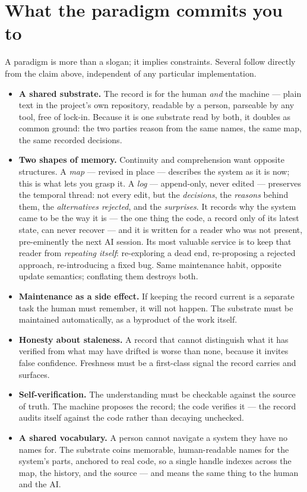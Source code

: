\documentclass[11pt]{article}
\begin{document}
\section{What the paradigm commits you to}

A paradigm is more than a slogan; it implies constraints. Several follow directly from the claim
above, independent of any particular implementation.

\begin{itemize}
  \item \textbf{A shared substrate.} The record is for the human \emph{and} the machine --- plain
  text in the project's own repository, readable by a person, parseable by any tool, free of
  lock-in. Because it is one substrate read by both, it doubles as common ground: the two parties
  reason from the same names, the same map, the same recorded decisions.

  \item \textbf{Two shapes of memory.} Continuity and comprehension want opposite structures. A
  \emph{map} --- revised in place --- describes the system as it is now; this is what lets you grasp
  it. A \emph{log} --- append-only, never edited --- preserves the temporal thread: not every edit,
  but the \emph{decisions}, the \emph{reasons} behind them, the \emph{alternatives rejected}, and the
  \emph{surprises}. It records why the system came to be the way it is --- the one thing the code, a
  record only of its latest state, can never recover --- and it is written for a reader who was not
  present, pre-eminently the next AI session. Its most valuable service is to keep that reader from
  \emph{repeating itself}: re-exploring a dead end, re-proposing a rejected approach, re-introducing a
  fixed bug. Same maintenance habit, opposite update semantics; conflating them destroys both.

  \item \textbf{Maintenance as a side effect.} If keeping the record current is a separate task the
  human must remember, it will not happen. The substrate must be maintained automatically, as a
  byproduct of the work itself.

  \item \textbf{Honesty about staleness.} A record that cannot distinguish what it has verified from
  what may have drifted is worse than none, because it invites false confidence. Freshness must be a
  first-class signal the record carries and surfaces.

  \item \textbf{Self-verification.} The understanding must be checkable against the source of truth.
  The machine proposes the record; the code verifies it --- the record audits itself against the code
  rather than decaying unchecked.

  \item \textbf{A shared vocabulary.} A person cannot navigate a system they have no names for. The
  substrate coins memorable, human-readable names for the system's parts, anchored to real code, so a
  single handle indexes across the map, the history, and the source --- and means the same thing to
  the human and the AI.
\end{itemize}
\end{document}

